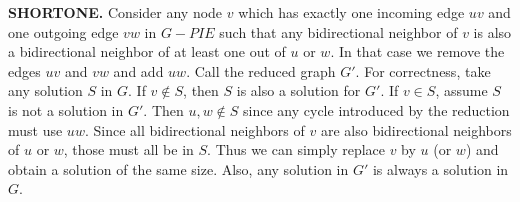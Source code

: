 
\textbf{SHORTONE.} Consider any node $v$ which has exactly one incoming edge $uv$ and one outgoing edge $vw$ in $G - PIE$ such that any bidirectional neighbor of $v$  is also a bidirectional neighbor of at least one out of $u$ or $w$. In that case we remove the edges $uv$ and $vw$ and add $uw$. Call the reduced graph $G'$. For correctness, take any solution $S$ in $G$. If $v \not \in S$, then $S$ is also a solution for $G'$. If $v \in S$, assume $S$ is not a solution in $G'$. Then $u,w \not \in S$ since any cycle introduced by the reduction must use $uw$. Since all bidirectional neighbors of $v$ are also bidirectional neighbors of $u$ or $w$, those must all be in $S$. Thus we can simply replace $v$ by $u$ (or $w$) and obtain a solution of the same size. Also, any solution in $G'$ is always a solution in $G$.